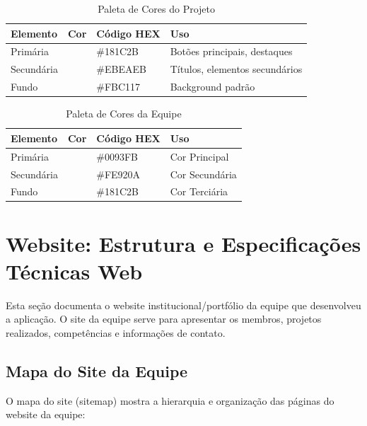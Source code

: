 \documentclass[11pt,a4paper]{article}
\begin{document}
\begin{table}[H]
\centering
\caption{Paleta de Cores do Projeto}
\label{tab:cores-projeto}
\begin{tabular}{|l|c|l|l|}
\hline
\textbf{Elemento} & \textbf{Cor} & \textbf{Código HEX} & \textbf{Uso} \\
\hline
Primária & \colorbox[HTML]{181C2B}{\phantom{AAA}} & \#181C2B & Botões principais, destaques \\
Secundária & \colorbox[HTML]{EBEAEB}{\phantom{AAA}} & \#EBEAEB & Títulos, elementos secundários \\
Fundo & \colorbox[HTML]{FBC117}{\phantom{AAA}} & \#FBC117 & Background padrão \\
\hline
\end{tabular}
\end{table}

\begin{table}[H]
\centering
\caption{Paleta de Cores da Equipe}
\label{tab:cores-equipe}
\begin{tabular}{|l|c|l|l|}
\hline
\textbf{Elemento} & \textbf{Cor} & \textbf{Código HEX} & \textbf{Uso} \\
\hline
Primária & \colorbox[HTML]{0093FB}{\phantom{AAA}} & \#0093FB & Cor Principal \\
Secundária & \colorbox[HTML]{FE920A}{\phantom{AAA}} & \#FE920A & Cor Secundária \\
Fundo & \colorbox[HTML]{181C2B}{\phantom{AAA}} & \#181C2B & Cor Terciária \\
\hline
\end{tabular}
\end{table}

\section{Website: Estrutura e Especificações Técnicas Web}

Esta seção documenta o website institucional/portfólio da equipe que desenvolveu a aplicação. O site da equipe serve para apresentar os membros, projetos realizados, competências e informações de contato.

\subsection{Mapa do Site da Equipe}

O mapa do site (sitemap) mostra a hierarquia e organização das páginas do website da equipe:
\end{document}
